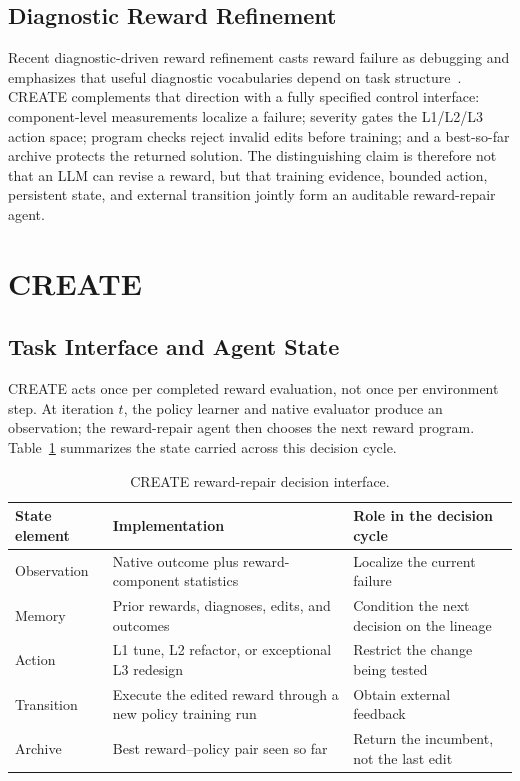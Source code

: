 \documentclass[conference]{IEEEtran}
\begin{document}
\subsection{Diagnostic Reward Refinement}
Recent diagnostic-driven reward refinement casts reward failure as debugging
and emphasizes that useful diagnostic vocabularies depend on task
structure~\cite{wang2026diagnostic}. CREATE complements that direction with a
fully specified control interface: component-level measurements localize a
failure; severity gates the L1/L2/L3 action space; program checks reject
invalid edits before training; and a best-so-far archive protects the returned
solution. The distinguishing claim is therefore not that an LLM can revise a
reward, but that training evidence, bounded action, persistent state, and
external transition jointly form an auditable reward-repair agent.

\section{CREATE}
\subsection{Task Interface and Agent State}
CREATE acts once per completed reward evaluation, not once per environment
step. At iteration $t$, the policy learner and native evaluator produce an
observation; the reward-repair agent then chooses the next reward program.
Table~\ref{tab:agent} summarizes the state carried across this decision cycle.

\begin{table}[t]
\caption{CREATE reward-repair decision interface.}
\label{tab:agent}
\centering
\scriptsize
\setlength{\tabcolsep}{3.1pt}
\begin{tabular}{p{}p{}p{}}
\toprule
State element & Implementation & Role in the decision cycle \\
\midrule
Observation & Native outcome plus reward-component statistics & Localize the
current failure \\
Memory & Prior rewards, diagnoses, edits, and outcomes & Condition the next
decision on the lineage \\
Action & L1 tune, L2 refactor, or exceptional L3 redesign & Restrict the change
being tested \\
Transition & Execute the edited reward through a new policy training run &
Obtain external feedback \\
Archive & Best reward--policy pair seen so far & Return the incumbent, not the
last edit \\
\bottomrule
\end{tabular}
\end{table}
\end{document}
